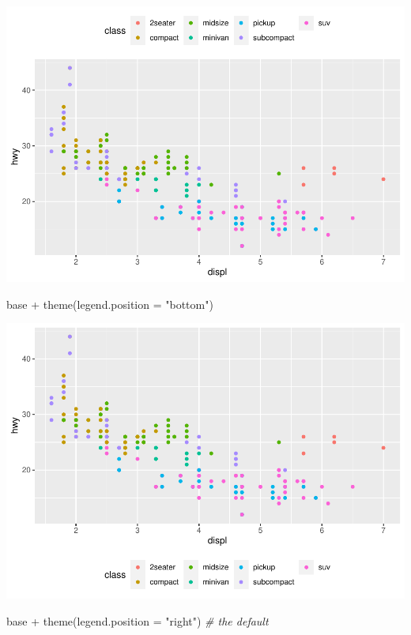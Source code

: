 \documentclass[
]{article}
\newenvironment{Shaded}{\begin{snugshade}}{\end{snugshade}}
\newcommand{\AttributeTok}[1]{\textcolor[rgb]{0.77,0.63,0.00}{#1}}
\newcommand{\CommentTok}[1]{\textcolor[rgb]{0.56,0.35,0.01}{\textit{#1}}}
\newcommand{\FunctionTok}[1]{\textcolor[rgb]{0.00,0.00,0.00}{#1}}
\newcommand{\NormalTok}[1]{#1}
\newcommand{\SpecialCharTok}[1]{\textcolor[rgb]{0.00,0.00,0.00}{#1}}
\newcommand{\StringTok}[1]{\textcolor[rgb]{0.31,0.60,0.02}{#1}}
\begin{document}
\includegraphics{Journal_files/figure-latex/unnamed-chunk-56-2.pdf}

\begin{Shaded}
\begin{Highlighting}[]
\NormalTok{base }\SpecialCharTok{+} \FunctionTok{theme}\NormalTok{(}\AttributeTok{legend.position =} \StringTok{"bottom"}\NormalTok{)}
\end{Highlighting}
\end{Shaded}

\includegraphics{Journal_files/figure-latex/unnamed-chunk-56-3.pdf}

\begin{Shaded}
\begin{Highlighting}[]
\NormalTok{base }\SpecialCharTok{+} \FunctionTok{theme}\NormalTok{(}\AttributeTok{legend.position =} \StringTok{"right"}\NormalTok{) }\CommentTok{\# the default}
\end{Highlighting}
\end{Shaded}
\end{document}
